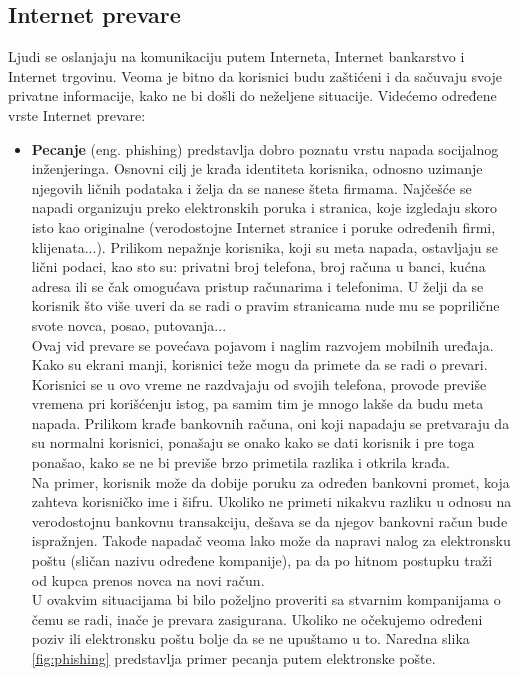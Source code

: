 \documentclass[a4paper]{article}
\begin{document}
\subsection{Internet prevare}
\label{subsec:podnaslovIP2}
Ljudi se oslanjaju na komunikaciju putem Interneta, Internet bankarstvo i Internet trgovinu. Veoma je bitno da korisnici budu zaštićeni i da sačuvaju svoje privatne informacije, kako ne bi došli do neželjene situacije. Videćemo određene vrste Internet prevare:
\begin{itemize}
\item\textbf{Pecanje} (eng. phishing) predstavlja dobro poznatu vrstu napada socijalnog inženjeringa. Osnovni cilj je krađa identiteta korisnika, odnosno uzimanje njegovih ličnih podataka i želja da se nanese šteta firmama. Najčešće se napadi organizuju preko elektronskih poruka i stranica, koje izgledaju skoro isto kao originalne (verodostojne Internet stranice i poruke određenih firmi, klijenata...). Prilikom nepažnje korisnika, koji su meta napada, ostavljaju se lični podaci, kao sto su: privatni broj telefona, broj računa u banci, kućna adresa ili se čak omogućava pristup računarima i telefonima. U želji da se korisnik što više uveri da se radi o pravim stranicama nude mu se poprilične svote novca, posao, putovanja...\\Ovaj vid prevare se povećava pojavom i naglim razvojem mobilnih uređaja. Kako su ekrani manji, korisnici teže mogu da primete da se radi o prevari. Korisnici se u ovo vreme ne razdvajaju od svojih telefona, provode previše vremena pri korišćenju istog, pa samim tim je mnogo lakše da budu meta napada. Prilikom krađe bankovnih računa, oni koji napadaju se pretvaraju da su normalni korisnici, ponašaju se onako kako se dati korisnik i pre toga ponašao, kako se ne bi previše brzo primetila razlika i otkrila krađa. 
\\Na primer, korisnik može da dobije poruku za određen bankovni promet, koja zahteva korisničko ime i šifru. Ukoliko ne primeti nikakvu razliku u odnosu na verodostojnu bankovnu transakciju, dešava se da njegov bankovni račun bude ispražnjen. Takođe napadač veoma lako može da napravi nalog za elektronsku poštu (sličan nazivu određene kompanije), pa da po hitnom postupku traži od kupca prenos novca na novi račun. \\U ovakvim situacijama bi bilo poželjno proveriti sa stvarnim kompanijama o čemu se radi, inače je prevara zasigurana. Ukoliko ne očekujemo određeni poziv ili elektronsku poštu bolje da se ne upuštamo u to. Naredna slika \ref{fig:phishing} predstavlja primer pecanja putem elektronske pošte.

\end{itemize}
\end{document}
